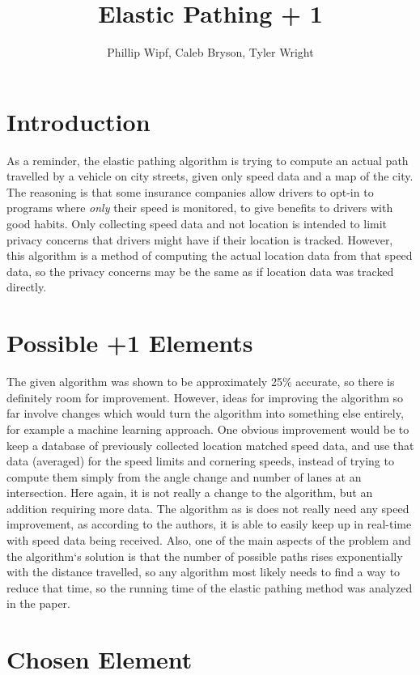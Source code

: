 \documentclass[11pt]{article}
\title{Elastic Pathing + 1}
\author{Phillip Wipf, Caleb Bryson, Tyler Wright}
\begin{document}
\maketitle
\section{Introduction}

As a reminder, the elastic pathing algorithm is trying to compute an actual path travelled by a vehicle on city streets, given only speed data and a map of the city.  The reasoning is that some insurance companies allow drivers to opt-in to programs where \emph{only} their speed is monitored, to give benefits to drivers with good habits.  Only collecting speed data and not location is intended to limit privacy concerns that drivers might have if their location is tracked.  However, this algorithm is a method of computing the actual location data from that speed data, so the privacy concerns may be the same as if location data was tracked directly.

\section{Possible +1 Elements}

The given algorithm was shown to be approximately 25\% accurate, so there is definitely room for improvement.  However, ideas for improving the algorithm so far involve changes which would turn the algorithm into something else entirely, for example a machine learning approach.  One obvious improvement would be to keep a database of previously collected location matched speed data, and use that data (averaged) for the speed limits and cornering speeds, instead of trying to compute them simply from the angle change and number of lanes at an intersection.  Here again, it is not really a change to the algorithm, but an addition requiring more data.
\newline
\newline
The algorithm as is does not really need any speed improvement, as according to the authors, it is able to easily keep up in real-time with speed data being received.  Also, one of the main aspects of the problem and the algorithm`s solution is that the number of possible paths rises exponentially with the distance travelled, so any algorithm most likely needs to find a way to reduce that time, so the running time of the elastic pathing method was analyzed in the paper.

\section{Chosen Element}
\end{document}

